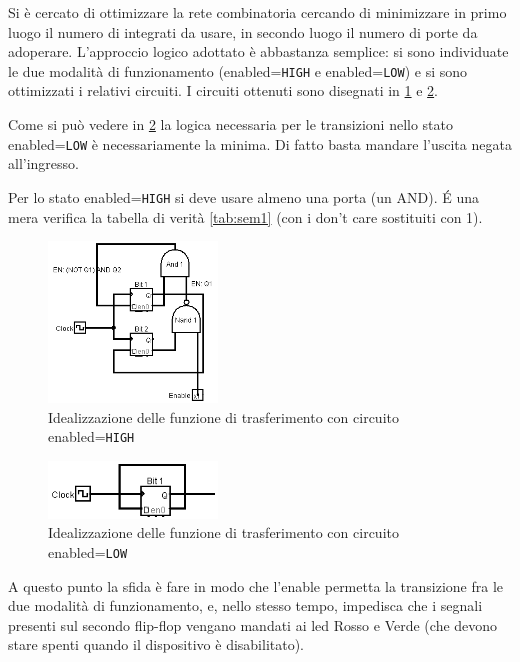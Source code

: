 \documentclass[a4paper,10pt]{article}
\def\code#1{\texttt{#1}}
\begin{document}
Si è cercato di ottimizzare la rete combinatoria cercando di minimizzare in primo luogo il numero di integrati da usare, in secondo luogo il numero di porte da adoperare. L'approccio logico adottato è abbastanza semplice: si sono individuate le due modalità di funzionamento (enabled=\code{HIGH} e enabled=\code{LOW}) e si sono ottimizzati i relativi circuiti. 
I circuiti ottenuti sono disegnati in \cref{fig:enabled} e \cref{fig:disabled}.



Come si può vedere in \cref{fig:disabled} la logica necessaria per le transizioni nello stato enabled=\code{LOW} è necessariamente la minima. Di fatto basta mandare l'uscita negata all'ingresso.


Per lo stato enabled=\code{HIGH} si deve usare almeno una porta (un AND). 
\'E una mera verifica la tabella di verità \cref{tab:sem1} (con i don't care sostituiti con 1).



\begin{figure}[H]
	\centering
	\includegraphics[width=0.4\textwidth]{../grafici/enabled1.png}
	\caption{Idealizzazione delle funzione di trasferimento con circuito enabled=\code{HIGH}}
	\label{fig:enabled}
\end{figure}


\begin{figure}[H]
	\centering
	\includegraphics[width=0.4\textwidth]{../grafici/disabled1.png}
	\caption{Idealizzazione delle funzione di trasferimento con circuito enabled=\code{LOW}}
	\label{fig:disabled}
\end{figure}

A questo punto la sfida è fare in modo che l'enable permetta la transizione fra le due modalità di funzionamento, e, nello stesso tempo, impedisca che i segnali presenti sul secondo flip-flop vengano mandati ai led Rosso e Verde (che devono stare spenti quando il dispositivo è disabilitato).
\end{document}
